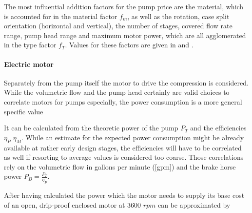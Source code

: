 			The most influential addition factors for the pump price are the material, which is accounted
			for in the material factor $f_m$, as well as the rotation, case split orientation (horizontal
			and vertical), the number of stages, covered flow rate range, pump head range and maximum
			motor power, which are all agglomerated in the type factor $f_T$. Values for these factors
			are given in  and .
			
			
		\paragraph{Electric motor}
			Separately from the pump itself the motor to drive the compression is considered. While the
			volumetric flow and the pump head certainly are valid choices to correlate motors for pumps
			especially, the power consumption is a more general specific value
			
			It can be calculated from the theoretic power of the pump $P_T$ and the efficiencies $\eta_P$
			$\eta_M$. While an estimate for the expected power consumption might be already available at
			rather early design stages, the efficiencies will have to be correlated as well if resorting
			to average values is considered too coarse. Those correlations rely on the volumetric flow in
			gallons per minute ([gpm]) and the brake horse power $P_B = \frac{P_T}{\eta_P}$.
			
			
			After having calculated the power which the motor needs to supply its base cost of an open,
			drip-proof enclosed motor at 3600 $rpm$ can be approximated by
			
